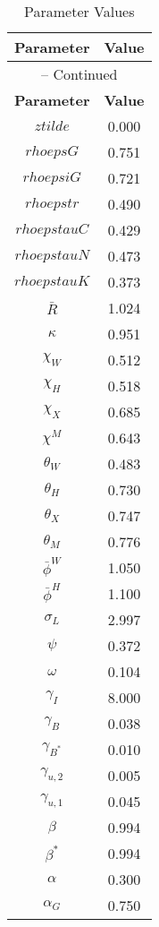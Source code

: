 \begin{center}
\begin{longtable}{cc}
\caption{Parameter Values}\\%
\toprule%
\multicolumn{1}{c}{\textbf{Parameter}} &
\multicolumn{1}{c}{\textbf{Value}}  \\%
\midrule%
\endfirsthead
\multicolumn{2}{c}{{\tablename} \thetable{} -- Continued}\\%
\midrule%
\multicolumn{1}{c}{\textbf{Parameter}} &
\multicolumn{1}{c}{\textbf{Value}} \\%
\midrule%
\endhead
$ztilde$ 	 & 	 0.000 \\
$rhoepsG$ 	 & 	 0.751 \\
$rhoepsiG$ 	 & 	 0.721 \\
$rhoepstr$ 	 & 	 0.490 \\
$rhoepstauC$ 	 & 	 0.429 \\
$rhoepstauN$ 	 & 	 0.473 \\
$rhoepstauK$ 	 & 	 0.373 \\
$\bar{R}$ 	 & 	 1.024 \\
$\kappa$ 	 & 	 0.951 \\
$\chi_W$ 	 & 	 0.512 \\
$\chi_H$ 	 & 	 0.518 \\
$\chi_X$ 	 & 	 0.685 \\
$\chi^M$ 	 & 	 0.643 \\
$\theta_W$ 	 & 	 0.483 \\
$\theta_H$ 	 & 	 0.730 \\
$\theta_X$ 	 & 	 0.747 \\
$\theta_M$ 	 & 	 0.776 \\
$\bar{\phi}^W$ 	 & 	 1.050 \\
$\bar{\phi}^H$ 	 & 	 1.100 \\
$\sigma_L$ 	 & 	 2.997 \\
$\psi$ 	 & 	 0.372 \\
$\omega$ 	 & 	 0.104 \\
$\gamma_I$ 	 & 	 8.000 \\
$\gamma_{B}$ 	 & 	 0.038 \\
$\gamma_{B^*}$ 	 & 	 0.010 \\
$\gamma_{u,2}$ 	 & 	 0.005 \\
$\gamma_{u,1}$ 	 & 	 0.045 \\
$\beta$ 	 & 	 0.994 \\
$\beta^*$ 	 & 	 0.994 \\
$\alpha$ 	 & 	 0.300 \\
$\alpha_G$ 	 & 	 0.750 \\

\end{longtable}
\end{center}
